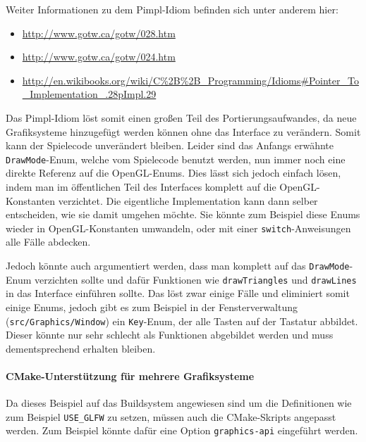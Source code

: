 \documentclass[12pt, a4paper, titlepage, hidelinks]{scrreprt}
\begin{document}

Weiter Informationen zu dem Pimpl-Idiom befinden sich unter anderem hier:
\begin{itemize}
\item \url{http://www.gotw.ca/gotw/028.htm}
\item \url{http://www.gotw.ca/gotw/024.htm}
\item \url{http://en.wikibooks.org/wiki/C%2B%2B_Programming/Idioms#Pointer_To_Implementation_.28pImpl.29}
\end{itemize}

Das Pimpl-Idiom löst somit einen großen Teil des Portierungsaufwandes, da neue Grafiksysteme hinzugefügt werden können ohne das Interface zu verändern. Somit kann der Spielecode unverändert bleiben. Leider sind das Anfangs erwähnte \texttt{DrawMode}-Enum, welche vom Spielecode benutzt werden, nun immer noch eine direkte Referenz auf die OpenGL-Enums. Dies lässt sich jedoch einfach lösen, indem man im öffentlichen Teil des Interfaces komplett auf die OpenGL-Konstanten verzichtet. Die eigentliche Implementation kann dann selber entscheiden, wie sie damit umgehen möchte. Sie könnte zum Beispiel diese Enums wieder in OpenGL-Konstanten umwandeln, oder mit einer \texttt{switch}-Anweisungen alle Fälle abdecken. 

Jedoch könnte auch argumentiert werden, dass man komplett auf das \texttt{DrawMode}-Enum verzichten sollte und dafür Funktionen wie \texttt{drawTriangles} und \texttt{drawLines} in das Interface einführen sollte. Das löst zwar einige Fälle und eliminiert somit einige Enums, jedoch gibt es zum Beispiel in der Fensterverwaltung (\texttt{src/Graphics/Window}) ein \texttt{Key}-Enum, der alle Tasten auf der Tastatur abbildet. Dieser könnte nur sehr schlecht als Funktionen abgebildet werden und muss dementsprechend erhalten bleiben.

\paragraph{CMake-Unterstützung für mehrere Grafiksysteme}
Da dieses Beispiel auf das Buildsystem angewiesen sind um die Definitionen wie zum Beispiel \texttt{USE\_GLFW} zu setzen, müssen auch die CMake-Skripts angepasst werden. Zum Beispiel könnte dafür eine Option \texttt{graphics-api} eingeführt werden.
\end{document}
